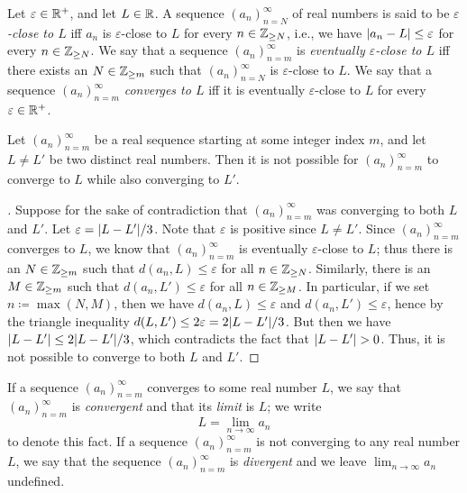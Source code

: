 \begin{defn}\label{i:6.1.5}
  Let \(\varepsilon \in \mathbb{R}^+\), and let \(L \in \mathbb{R}\).
  A sequence \((a_n)_{n = N}^\infty\) of real numbers is said to be \emph{\(\varepsilon\)-close to \(L\)} iff \(a_n\) is \(\varepsilon\)-close to \(L\) for every \(n \in \mathbb{Z}_{\geq N}\), i.e., we have \(\left\lvert a_n - L\right\rvert \leq \varepsilon\) for every \(n \in \mathbb{Z}_{\geq N}\).
  We say that a sequence \((a_n)_{n = m}^\infty\) is \emph{eventually \(\varepsilon\)-close to \(L\)} iff there exists an \(N \in \mathbb{Z}_{\geq m}\) such that \((a_n)_{n = N}^\infty\) is \(\varepsilon\)-close to \(L\).
  We say that a sequence \((a_n)_{n = m}^\infty\) \emph{converges to \(L\)} iff it is eventually \(\varepsilon\)-close to \(L\) for every \(\varepsilon \in \mathbb{R}^+\).
\end{defn}

\setcounter{thm}{6}
\begin{prop}\label{i:6.1.7}
  Let \((a_n)_{n = m}^\infty\) be a real sequence starting at some integer index \(m\), and let \(L \neq L'\) be two distinct real numbers.
  Then it is not possible for \((a_n)_{n = m}^\infty\) to converge to \(L\) while also converging to \(L'\).
\end{prop}

\begin{proof}[]
  Suppose for the sake of contradiction that \((a_n)_{n = m}^\infty\) was converging to both \(L\) and \(L'\).
  Let \(\varepsilon = \abs{L - L'} / 3\).
  Note that \(\varepsilon\) is positive since \(L \neq L'\).
  Since \((a_n)_{n = m}^\infty\) converges to \(L\), we know that \((a_n)_{n = m}^\infty\) is eventually \(\varepsilon\)-close to \(L\);
  thus there is an \(N \in \mathbb{Z}_{\geq m}\) such that \(d(a_n, L) \leq \varepsilon\) for all \(n \in \mathbb{Z}_{\geq N}\).
  Similarly, there is an \(M \in \mathbb{Z}_{\geq m}\) such that \(d(a_n, L') \leq \varepsilon\) for all \(n \in \mathbb{Z}_{\geq M}\).
  In particular, if we set \(n \coloneqq \max(N, M)\), then we have \(d(a_n, L) \leq \varepsilon\) and \(d(a_n, L') \leq \varepsilon\), hence by the triangle inequality \(d(L, L') \leq 2\varepsilon = 2\abs{L - L'} / 3\).
  But then we have \(\abs{L - L'} \leq 2\abs{L - L'} / 3\), which contradicts the fact that \(\left\lvert L - L'\right\rvert > 0\).
  Thus, it is not possible to converge to both \(L\) and \(L'\).
\end{proof}

\begin{defn}\label{i:6.1.8}
  If a sequence \((a_n)_{n = m}^\infty\) converges to some real number \(L\), we say that \((a_n)_{n = m}^\infty\) is \emph{convergent} and that its \emph{limit} is \(L\);
  we write
  \[
    L = \lim_{n \to \infty} a_n
  \]
  to denote this fact.
  If a sequence \((a_n)_{n = m}^\infty\) is not converging to any real number \(L\), we say that the sequence \((a_n)_{n = m}^\infty\) is \emph{divergent} and we leave \(\lim_{n \to \infty} a_n\) undefined.
\end{defn}

